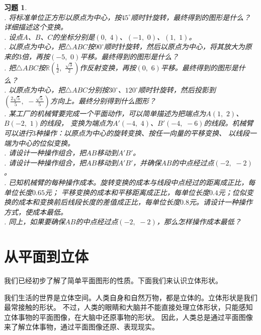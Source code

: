 \documentclass[12pt,UTF8]{ctexbook}
\newtheorem{xt}{习题}[section]
\begin{document}
\begin{xt}
    \mbox{}\\
    . 将标准单位正方形以原点为中心，按$45^\circ$顺时针旋转，最终得到的图形是什么？详细描述这个变换。\\
    . 设点$A$、$B$、$C$的坐标分别是$(0,\,\, 4)$、$(-1,\,\, 0)$、$(1,\,\,1)$。\\
    . 以原点为中心，把$\triangle ABC$按$90^\circ$顺时针旋转，然后以原点为中心，将其放大为原来的$3$倍，再按$(-5, \,\, 0)$平移。最终得到的图形是什么？\\
    . 把$\triangle ABC$按$\mathbb{R}\left(\frac{1}{2},\,\, \frac{\sqrt{3}}{2}\right)$作反射变换，再按$(0,\,\, 6)$平移。最终得到的图形是什么？\\
    . 以原点为中心，把$\triangle ABC$分别按$30^\circ$、$120^\circ$顺时针旋转，然后投影到$\left(\frac{2\sqrt{5}}{5},\,\, -\frac{\sqrt{5}}{5}\right)$方向上。最终分别得到什么图形？\\
    . 某工厂的机械臂要完成一个平面动作，可以简单描述为把端点为$A(1,\,\, 2)$、$B(-2,\,\, 1)$的线段，
    变换为端点为$A'(-4,\,\, 4)$、$B'(-4,\,\, -6)$的线段。机械臂可以进行$3$种操作：以原点为中心的旋转变换、按任一向量的平移变换、
    以线段一端为中心的位似变换。\\
    . 请设计一种操作组合，把$AB$移动到$A'B'$。\\
    . 请设计一种操作组合，把$AB$移动到$A'B'$，并确保$AB$的中点经过点$(-2,\,\, -2)$。\\
    . 已知机械臂的每种操作成本。旋转变换的成本与线段中点经过的距离成正比，每单位长度$0.65$元；
    平移变换的成本和平移距离成正比，每单位长度$0.4$元；位似变换的成本和变换前后线段长度的差值成正比，每单位长度$0.8$元。请设计一种操作方式，使成本最低。\\
    . 同上，如果要确保$AB$的中点经过点$(-2,\,\, -2)$，那么怎样操作成本最低？
\end{xt}

\chapter{从平面到立体}

我们已经初步了解了简单平面图形的性质。下面我们来认识立体形状。

我们生活的世界是立体空间。人类自身和自然万物，都是立体的。立体形状是我们最常接触的形状。
不过，人类的眼睛和大脑并不能直接处理立体形状，只能感知立体事物的平面图像，在大脑中还原事物的形状。
因此，人类总是通过平面图像来了解立体事物，通过平面图像还原、表现现实。
\end{document}
